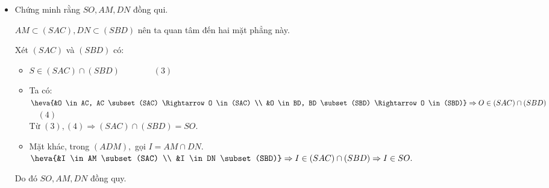 \begin{vd}
{\begin{itemize}
{}
			\item Chứng minh rằng $SO, AM, DN$ đồng qui.
			\begin{nx}
				$AM \subset (SAC), DN \subset (SBD)$ nên ta quan tâm đến hai mặt phẳng này.
			\end{nx}
			Xét $(SAC)$ và $(SBD)$ có:
			\begin{itemize}
				\item $S \in(SAC) \cap (SBD) \quad\quad\quad\quad (3)$
				\item Ta có: $\heva{&O \in AC, AC \subset (SAC) \Rightarrow O \in(SAC) \\ 
					&O \in BD, BD \subset(SBD) \Rightarrow O \in(SBD)} \Rightarrow O \in (SAC) \cap (SBD)$ $\quad (4)$\\
				Từ $(3),(4) \Rightarrow(SAC) \cap(SBD)=SO.$
				\item Mặt khác, trong $(ADM),$ gọi $I= AM \cap DN$.\\
				$\heva{&I \in AM \subset(SAC) \\ &I \in DN \subset(SBD)} \Rightarrow I \in(SAC) \cap(SBD) \Rightarrow I \in SO.$
			\end{itemize}
			Do đó $SO, AM, DN$ đồng quy.
		\end{itemize}
	}
\end{vd}

